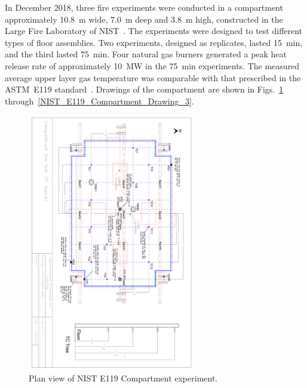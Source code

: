 In December 2018, three fire experiments were conducted in a compartment approximately 10.8~m wide, 7.0~m deep and 3.8~m high, constructed in the Large Fire Laboratory of NIST~\cite{Ana:TN2070}. The experiments were designed to test different types of floor assemblies. Two experiments, designed as replicates, lasted 15~min, and the third lasted 75~min. Four natural gas burners generated a peak heat release rate of approximately 10~MW in the 75~min experiments. The measured average upper layer gas temperature was comparable with that prescribed in the ASTM~E119 standard~\cite{E119}. Drawings of the compartment are shown in Figs.~\ref{NIST_E119_Compartment_Drawing_1} through~\ref{NIST_E119_Compartment_Drawing_3}.

\begin{figure}
\includegraphics[width=0.65\textwidth, angle =90]{FIGURES/NIST_E119_Compartment/NIST_E119_Compartment_TCTrees}
\caption[Plan view of NIST E119 Compartment experiment]{Plan view of NIST E119 Compartment experiment.}
\label{NIST_E119_Compartment_Drawing_1}
\end{figure}

